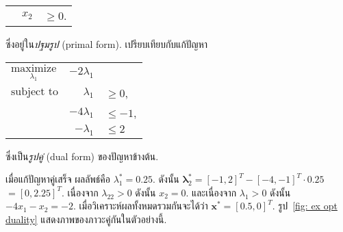 \begin{Exercise}
\begin{center}
\begin{tabular}{lrl}
\\
& $x_2$        & $\geq 0$.
\end{tabular} 
\end{center}
ซึ่งอยู่ใน\textit{ปฐมรูป} (primal form).
เปรียบเทียบกับแก้ปัญหา
%
\begin{center}
\begin{tabular}{lrl}
$\underset{\lambda_1}{\mathrm{maximize}}$ & $-2 \lambda_1$ & 
\\
$\mbox{subject to}$ & $\lambda_1$ & $\geq 0$, 
\\
& $-4 \lambda_1$        & $\leq -1$,
\\
& $-\lambda_1$        & $\leq 2$	
\end{tabular}
\end{center}
ซึ่งเป็น\textit{รูปคู่} (dual form) ของปัญหาข้างต้น.

เมื่อแก้ปัญหาคู่เสร็จ ผลลัพธ์คือ $\lambda_1^\ast = 0.25$.
ดังนั้น $\bm{\lambda}_2^\ast = [-1, 2]^T - [-4, -1]^T \cdot 0.25$
$= [0, 2.25]^T$. 
เนื่องจาก $\lambda_{22} > 0$ ดังนั้น $x_2 = 0$.
และเนื่องจาก $\lambda_1 > 0$ ดังนั้น $-4 x_1 - x_2 = -2$.
เมื่อวิเคราะห์ผลทั้งหมดรวมกันจะได้ว่า $\bm{x}^\ast = [0.5, 0]^T$.
รูป~\ref{fig: ex opt duality}
แสดงภาพของภาวะคู่กันในตัวอย่างนี้.


\end{Exercise}
